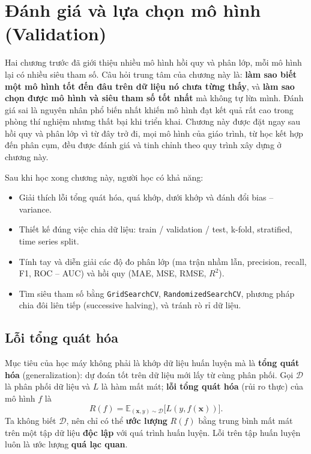 
\chapter{Đánh giá và lựa chọn mô hình \\ (Validation)}
\label{chap:validation}

Hai chương trước đã giới thiệu nhiều mô hình hồi quy và phân lớp, mỗi mô hình lại có nhiều siêu tham số. Câu hỏi trung tâm của chương này là: \textbf{làm sao biết một mô hình tốt đến đâu trên dữ liệu nó chưa từng thấy}, và \textbf{làm sao chọn được mô hình và siêu tham số tốt nhất} mà không tự lừa mình. Đánh giá sai là nguyên nhân phổ biến nhất khiến mô hình đạt kết quả rất cao trong phòng thí nghiệm nhưng thất bại khi triển khai. Chương này được đặt ngay sau hồi quy và phân lớp vì từ đây trở đi, mọi mô hình của giáo trình, từ học kết hợp đến phân cụm, đều được đánh giá và tinh chỉnh theo quy trình xây dựng ở chương này.

\noindent Sau khi học xong chương này, người học có khả năng:
\begin{itemize}
    \item Giải thích lỗi tổng quát hóa, quá khớp, dưới khớp và đánh đổi bias -- variance.
    \item Thiết kế đúng việc chia dữ liệu: train / validation / test, k-fold, stratified, time series split.
    \item Tính tay và diễn giải các độ đo phân lớp (ma trận nhầm lẫn, precision, recall, F1, ROC -- AUC) và hồi quy (MAE, MSE, RMSE, $R^2$).
    \item Tìm siêu tham số bằng \texttt{GridSearchCV}, \texttt{RandomizedSearchCV}, phương pháp chia đôi liên tiếp (successive halving), và tránh rò rỉ dữ liệu.
\end{itemize}

\section{Lỗi tổng quát hóa}

Mục tiêu của học máy không phải là khớp dữ liệu huấn luyện mà là \textbf{tổng quát hóa} (generalization): dự đoán tốt trên dữ liệu mới lấy từ cùng phân phối. Gọi $\mathcal{D}$ là phân phối dữ liệu và $L$ là hàm mất mát; \textbf{lỗi tổng quát hóa} (rủi ro thực) của mô hình $f$ là
\begin{equation}
    R(f) = \mathbb{E}_{(\mathbf{x}, y) \sim \mathcal{D}}\big[L(y, f(\mathbf{x}))\big].
\end{equation}
Ta không biết $\mathcal{D}$, nên chỉ có thể \textbf{ước lượng} $R(f)$ bằng trung bình mất mát trên một tập dữ liệu \textbf{độc lập} với quá trình huấn luyện. Lỗi trên tập huấn luyện luôn là ước lượng \textbf{quá lạc quan}.

